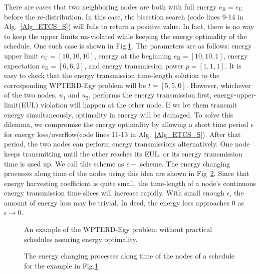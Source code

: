 \documentclass[journal,10pt]{IEEEtran}
\begin{document}
There are cases that two neighboring nodes are both with full energy $e_\text{B}{=}e_\text{U}$ before the re-distribution. In this case, the bisection search (code lines 9-14 in Alg.~\ref{Alg_ETCS_S}) will fails to return a positive value. In fact, there is no way to keep the upper limits un-violated while keeping the energy optimality of the schedule. One such case is shown in Fig.\ref{fig_full}. The parameters are as follows: energy upper limit $e_\text{U}{=}[10,10,10]$, energy at the beginning $e_\text{B}{=}[10,10,1]$, energy expectation $e_\text{E}{=}[6,6,2]$, and energy transmission power $p{=}[1,1,1]$. It is easy to check that the energy transmission time-length solution to the corresponding WPTERD-Egy problem will be $t{=}[5,5,0]$. However, whichever of the two nodes, $u_1$ and $u_2$, performs the energy transmission first, energy-upper-limit(EUL) violation will happen at the other node. If we let them transmit energy simultaneously, optimality in energy will be damaged. To solve this dilemma, we compromise the energy optimality by allowing a short time period $\epsilon$ for energy loss/overflow(code lines 11-13 in Alg.~\ref{Alg_ETCS_S}). After that period, the two nodes can perform energy transmissions alternatively. One node keeps transmitting until the other reaches its EUL, or its energy transmission time is used up. We call this scheme as $\epsilon{-}$ scheme. The energy changing processes along time of the nodes using this idea are shown in Fig~\ref{fig_full_sch}. Since that energy harvesting coefficient is quite small, the time-length of a node's continuous energy transmission time slices will increase rapidly. With small enough $\epsilon$, the amount of energy loss may be trivial. In deed, the energy loss approaches 0 as $\epsilon{\rightarrow}0$.

\begin{figure}[htb]
\caption{An example of the WPTERD-Egy problem without practical schedules assuring energy optimality.}
\label{fig_full}
\end{figure}

\vspace{-4mm}
\begin{figure}[htb]
\caption{The energy changing processes along time of the nodes of a schedule for the example in Fig.\ref{fig_full}.}
\label{fig_full_sch}
\end{figure}
\end{document}
